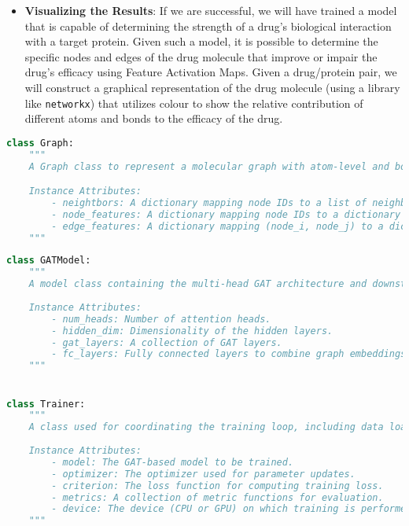 \documentclass[fontsize=11pt]{article}
\begin{document}
\begin{itemize}
    \item \textbf{Visualizing the Results}: If we are successful, we will have trained a model that is capable of determining the strength of a drug's biological interaction with a target protein. Given such a model, it is possible to determine the specific nodes and edges of the drug molecule that improve or impair the drug's efficacy using Feature Activation Maps. Given a drug/protein pair, we will construct a graphical representation of the drug molecule (using a library like \texttt{networkx}) that utilizes colour to show the relative contribution of different atoms and bonds to the efficacy of the drug.
    
\end{itemize}

\begin{lstlisting}[language=Python, caption={Python implementation of a Graph class for molecular data}, label={lst:graph_class}]
class Graph:
    """
    A Graph class to represent a molecular graph with atom-level and bond-level features.

    Instance Attributes:
        - neightbors: A dictionary mapping node IDs to a list of neighboring node IDs.
        - node_features: A dictionary mapping node IDs to a dictionary of that node's features.
        - edge_features: A dictionary mapping (node_i, node_j) to a dictionary of bond-level features.
    """
\end{lstlisting}

\begin{lstlisting}[language=Python, caption={Scratch implementation of \texttt{GATModel} and \texttt{Trainer} classes}, label={lst:listing2}]
class GATModel:
    """
    A model class containing the multi-head GAT architecture and downstream fully connected layers for final prediction.
    
    Instance Attributes:
        - num_heads: Number of attention heads.
        - hidden_dim: Dimensionality of the hidden layers.
        - gat_layers: A collection of GAT layers.
        - fc_layers: Fully connected layers to combine graph embeddings with protein features for final prediction.
    """


class Trainer:
    """
    A class used for coordinating the training loop, including data loading, backpropagation, and logging.
    
    Instance Attributes:
        - model: The GAT-based model to be trained.
        - optimizer: The optimizer used for parameter updates.
        - criterion: The loss function for computing training loss.
        - metrics: A collection of metric functions for evaluation.
        - device: The device (CPU or GPU) on which training is performed.
    """
\end{lstlisting}
\end{document}
